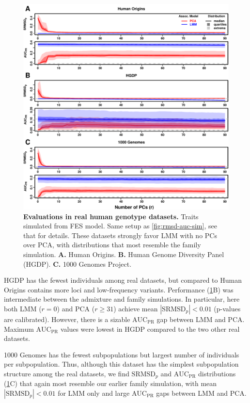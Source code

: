 \documentclass[11pt]{article}
\newcommand{\rmsd}{\text{SRMSD}_p}
\newcommand{\auc}{\text{AUC}_\text{PR}}
\begin{document}
\begin{figure}[bp!]
  \centering
  \includegraphics[width=\textwidth,height=\textheight,keepaspectratio]{fes/rmsd-auc-real.pdf}
  \caption{
    {\small 
      {\bf Evaluations in real human genotype datasets.}
      Traits simulated from FES model.
      Same setup as \cref{fig:rmsd-auc-sim}, see that for details.
      These datasets strongly favor LMM with no PCs over PCA, with distributions that most resemble the family simulation.
      \textbf{A.}
      Human Origins.
      \textbf{B.}
      Human Genome Diversity Panel (HGDP).
      \textbf{C.}
      1000 Genomes Project.
    }
  }
  \label{fig:rmsd-auc-real}
\end{figure}

HGDP has the fewest individuals among real datasets, but compared to Human Origins contains more loci and low-frequency variants.
Performance (\cref{fig:rmsd-auc-real}B) was intermediate between the admixture and family simulations.
In particular, here both LMM ($r=0$) and PCA ($r \ge 31$) achieve mean $|\rmsd| < 0.01$ (p-values are calibrated).
However, there is a sizable $\auc$ gap between LMM and PCA.
Maximum $\auc$ values were lowest in HGDP compared to the two other real datasets.

1000 Genomes has the fewest subpopulations but largest number of individuals per subpopulation.
Thus, although this dataset has the simplest subpopulation structure among the real datasets, we find $\rmsd$ and $\auc$ distributions (\cref{fig:rmsd-auc-real}C) that again most resemble our earlier family simulation, with mean $|\rmsd| < 0.01$ for LMM only and large $\auc$ gaps between LMM and PCA.
\end{document}
